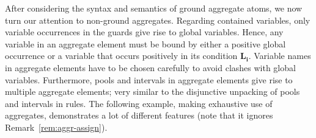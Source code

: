 After considering the syntax and semantics of ground aggregate atoms,
we now turn our attention to non-ground aggregates.
Regarding contained variables,
only variable occurrences in the guards give rise to global variables.
Hence, any variable in an aggregate element must be bound by
either a positive global occurrence or
a variable that occurs positively in its condition $\boldsymbol{L_i}$.
Variable names in aggregate elements have to be chosen carefully to avoid clashes with global variables.
Furthermore, pools and intervals in aggregate elements give rise to multiple aggregate elements;
very similar to the disjunctive unpacking of pools and intervals in rules.
The following example, making exhaustive use of aggregates,
demonstrates a lot of different features
(note that it ignores Remark~\ref{rem:aggr-assign}).

